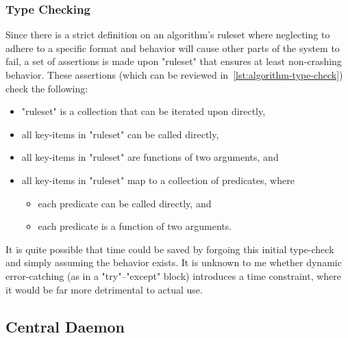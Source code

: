 \subsubsection{Type Checking}
\label{sec:logic-repr:self-stab-algor:type-checking}

Since there is a strict definition on an algorithm's ruleset
  where neglecting to adhere to a specific format and behavior
  will cause other parts of the system to fail,
  a set of assertions is made upon "ruleset" that ensures at least non-crashing behavior.
These assertions (which can be reviewed in~\autoref{lst:algorithm-type-check}) check the following:
\begin{itemize}
\item "ruleset" is a collection that can be iterated upon directly,
\item all key-items in "ruleset" can be called directly,
\item all key-items in "ruleset" are functions of two arguments, and
\item all key-items in "ruleset" map to a collection of predicates, where
  \begin{itemize}
  \item each predicate can be called directly, and
  \item each predicate is a function of two arguments.
  \end{itemize}
\end{itemize}
It is quite possible that time could be saved by
  forgoing this initial type-check and simply assuming the behavior exists.
It is unknown to me whether dynamic error-catching (as in a "try"--"except" block)
  introduces a time constraint, where it would be far more detrimental to actual use.


\subsection{Central Daemon}
\label{sec:logic-repr:daemon}

